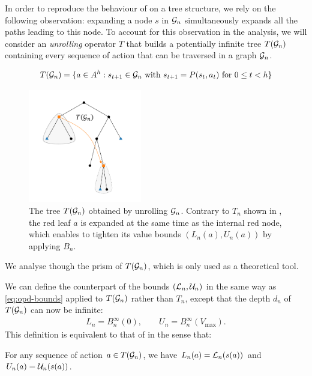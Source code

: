 \documentclass[runningheads]{llncs}
\begin{document}
In order to reproduce the behaviour of  on a tree structure, we rely on the following observation:  expanding a node $s$ in $\mathcal{G}_n$ simultaneously expands all the paths leading to this node.
To account for this observation in the analysis, we will consider an \emph{unrolling} operator $T$ that builds a potentially infinite tree $T(\mathcal{G}_n)$ containing every sequence of action that can be traversed in a graph $\mathcal{G}_n$.

\begin{equation}
T(\mathcal{G}_n) = \{a\in A^h: s_{t+1} \in \mathcal{G}_n \text{ with } s_{t+1} = P(s_{t}, a_t)\text{ for } 0 \leq t < h\}
\end{equation}

\begin{figure}[htp]
	\centering
	\includegraphics[trim={2.cm 1cm 2.5cm 1cm}, clip, width=0.44\textwidth]{img/tree_5.pdf}
	\caption{The tree $T(\mathcal{G}_n)$ obtained by unrolling $\mathcal{G}_n$. Contrary to $T_n$ shown in , the red leaf $a$ is expanded at the same time as the internal red node, which enables to tighten its value bounds $(L_n(a), U_n(a))$ by applying $B_n$.}
	\label{fig:unroll}
\end{figure}
We analyse \GBOPD though the prism of $T(\mathcal{G}_n)$, which is only used as a theoretical tool. 

We can define the counterpart of the bounds $(\mathcal{L}_n, \mathcal{U}_n)$ in the same way as \eqref{eq:opd-bounds} applied to $T(\mathcal{G}_n)$ rather than $T_n$, except that the depth $d_n$ of $T(\mathcal{G}_n)$ can now be infinite:
\begin{align}
\label{eq:gbop-t-bounds}
L_n = B_n^{\infty}(0), \qquad U_n = B_n^{\infty}(V_{\max}).
\end{align}
This definition is equivalent to that of \GBOPD in the sense that:
\begin{lemma}
	\label{lem:equivalence}
For any sequence of action $a\in T(\mathcal{G}_n)$, we have $L_n(a) = \mathcal{L}_n(s(a))$ and $U_n(a) = \mathcal{U}_n(s(a))$.	
\end{lemma}
\end{document}

